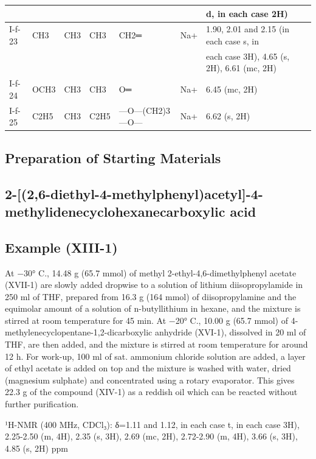 \documentclass[11pt,a4paper]{article}
\begin{document}
\begin{table}[h]
\begin{tabular}{|l|l|l|l|l|l|l|l|}
 &  &  &  &  &  & d, in each case 2H) &  \\ \hline
I-f-23 & CH3 & CH3 & CH3 & CH2═ & Na+ & 1.90, 2.01 and 2.15 (in each case s, in &  \\ \hline
 &  &  &  &  &  & each case 3H), 4.65 (s, 2H), 6.61 (mc, 2H) &  \\ \hline
I-f-24 & OCH3 & CH3 & CH3 & O═ & Na+ & 6.45 (mc, 2H) &  \\ \hline
I-f-25 & C2H5 & CH3 & C2H5 & —O—(CH2)3—O— & Na+ & 6.62 (s, 2H) &  \\ \hline
\end{tabular}
\end{table}

\subsection{Preparation of Starting Materials}

\subsection{2-[(2,6-diethyl-4-methylphenyl)acetyl]-4-methylidenecyclohexanecarboxylic acid}

\subsection{Example (XIII-1)}

At −30° C., 14.48 g (65.7 mmol) of methyl 2-ethyl-4,6-dimethylphenyl acetate (XVII-1) are slowly added dropwise to a solution of lithium diisopropylamide in 250 ml of THF, prepared from 16.3 g (164 mmol) of diisopropylamine and the equimolar amount of a solution of n-butyllithium in hexane, and the mixture is stirred at room temperature for 45 min. At −20° C., 10.00 g (65.7 mmol) of 4-methylenecyclopentane-1,2-dicarboxylic anhydride (XVI-1), dissolved in 20 ml of THF, are then added, and the mixture is stirred at room temperature for around 12 h. For work-up, 100 ml of sat. ammonium chloride solution are added, a layer of ethyl acetate is added on top and the mixture is washed with water, dried (magnesium sulphate) and concentrated using a rotary evaporator. This gives 22.3 g of the compound (XIV-1) as a reddish oil which can be reacted without further purification.

¹H-NMR (400 MHz, CDCl₃): δ=1.11 and 1.12, in each case t, in each case 3H), 2.25-2.50 (m, 4H), 2.35 (s, 3H), 2.69 (mc, 2H), 2.72-2.90 (m, 4H), 3.66 (s, 3H), 4.85 (s, 2H) ppm
\end{document}
